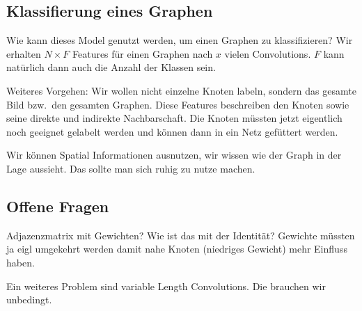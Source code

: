 \subsection{Klassifierung eines Graphen}

Wie kann dieses Model genutzt werden, um einen Graphen zu klassifizieren?
Wir erhalten $N \times F$ Features für einen Graphen nach $x$ vielen Convolutions.
$F$ kann natürlich dann auch die Anzahl der Klassen sein.

Weiteres Vorgehen:
Wir wollen nicht einzelne Knoten labeln, sondern das gesamte Bild bzw.\ den gesamten Graphen.
Diese Features beschreiben den Knoten sowie seine direkte und indirekte Nachbarschaft.
Die Knoten müssten jetzt eigentlich noch geeignet gelabelt werden und können dann in ein Netz gefüttert werden.

Wir können Spatial Informationen ausnutzen, wir wissen wie der Graph in der Lage aussieht.
Das sollte man sich ruhig zu nutze machen.

\subsection{Offene Fragen}

Adjazenzmatrix mit Gewichten? Wie ist das mit der Identität? Gewichte müssten ja eigl umgekehrt werden damit nahe Knoten (niedriges Gewicht) mehr Einfluss haben.

Ein weiteres Problem sind variable Length Convolutions.
Die brauchen wir unbedingt.
